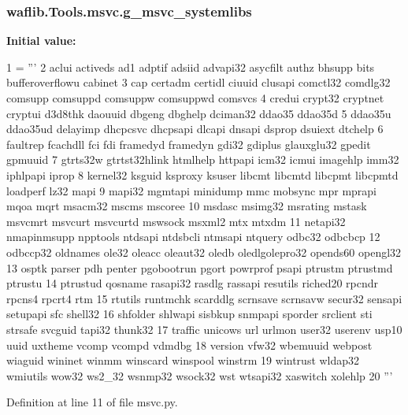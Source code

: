 \subsubsection[{\texorpdfstring{g\+\_\+msvc\+\_\+systemlibs}{g_msvc_systemlibs}}]{ waflib.\+Tools.\+msvc.\+g\+\_\+msvc\+\_\+systemlibs}\hypertarget{namespacewaflib_1_1_tools_1_1msvc_a5701e2c6c010e48d48c77dd65f11528d}{}\label{namespacewaflib_1_1_tools_1_1msvc_a5701e2c6c010e48d48c77dd65f11528d}
{\bfseries Initial value\+:}
\begin{DoxyCode}
1 = \textcolor{stringliteral}{'''}
2 \textcolor{stringliteral}{aclui activeds ad1 adptif adsiid advapi32 asycfilt authz bhsupp bits bufferoverflowu cabinet}
3 \textcolor{stringliteral}{cap certadm certidl ciuuid clusapi comctl32 comdlg32 comsupp comsuppd comsuppw comsuppwd comsvcs}
4 \textcolor{stringliteral}{credui crypt32 cryptnet cryptui d3d8thk daouuid dbgeng dbghelp dciman32 ddao35 ddao35d}
5 \textcolor{stringliteral}{ddao35u ddao35ud delayimp dhcpcsvc dhcpsapi dlcapi dnsapi dsprop dsuiext dtchelp}
6 \textcolor{stringliteral}{faultrep fcachdll fci fdi framedyd framedyn gdi32 gdiplus glauxglu32 gpedit gpmuuid}
7 \textcolor{stringliteral}{gtrts32w gtrtst32hlink htmlhelp httpapi icm32 icmui imagehlp imm32 iphlpapi iprop}
8 \textcolor{stringliteral}{kernel32 ksguid ksproxy ksuser libcmt libcmtd libcpmt libcpmtd loadperf lz32 mapi}
9 \textcolor{stringliteral}{mapi32 mgmtapi minidump mmc mobsync mpr mprapi mqoa mqrt msacm32 mscms mscoree}
10 \textcolor{stringliteral}{msdasc msimg32 msrating mstask msvcmrt msvcurt msvcurtd mswsock msxml2 mtx mtxdm}
11 \textcolor{stringliteral}{netapi32 nmapinmsupp npptools ntdsapi ntdsbcli ntmsapi ntquery odbc32 odbcbcp}
12 \textcolor{stringliteral}{odbccp32 oldnames ole32 oleacc oleaut32 oledb oledlgolepro32 opends60 opengl32}
13 \textcolor{stringliteral}{osptk parser pdh penter pgobootrun pgort powrprof psapi ptrustm ptrustmd ptrustu}
14 \textcolor{stringliteral}{ptrustud qosname rasapi32 rasdlg rassapi resutils riched20 rpcndr rpcns4 rpcrt4 rtm}
15 \textcolor{stringliteral}{rtutils runtmchk scarddlg scrnsave scrnsavw secur32 sensapi setupapi sfc shell32}
16 \textcolor{stringliteral}{shfolder shlwapi sisbkup snmpapi sporder srclient sti strsafe svcguid tapi32 thunk32}
17 \textcolor{stringliteral}{traffic unicows url urlmon user32 userenv usp10 uuid uxtheme vcomp vcompd vdmdbg}
18 \textcolor{stringliteral}{version vfw32 wbemuuid  webpost wiaguid wininet winmm winscard winspool winstrm}
19 \textcolor{stringliteral}{wintrust wldap32 wmiutils wow32 ws2\_32 wsnmp32 wsock32 wst wtsapi32 xaswitch xolehlp}
20 \textcolor{stringliteral}{'''}
\end{DoxyCode}


Definition at line 11 of file msvc.\+py.

